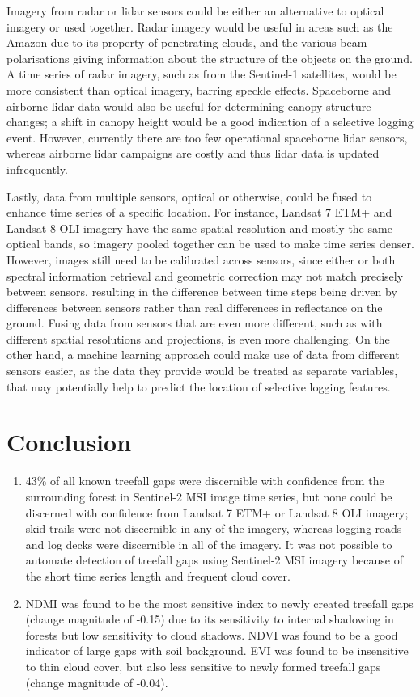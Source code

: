 \documentclass[a4paper,12pt]{scrbook}
\begin{document}
Imagery from radar or lidar sensors could be either an alternative to optical imagery or used together. Radar imagery would be useful in areas such as the Amazon due to its property of penetrating clouds, and the various beam polarisations giving information about the structure of the objects on the ground. A time series of radar imagery, such as from the Sentinel-1 satellites, would be more consistent than optical imagery, barring speckle effects. Spaceborne and airborne lidar data would also be useful for determining canopy structure changes; a shift in canopy height would be a good indication of a selective logging event. However, currently there are too few operational spaceborne lidar sensors, whereas airborne lidar campaigns are costly and thus lidar data is updated infrequently.

Lastly, data from multiple sensors, optical or otherwise, could be fused to enhance time series of a specific location. For instance, Landsat 7 \ac{ETM+} and Landsat 8 \ac{OLI} imagery have the same spatial resolution and mostly the same optical bands, so imagery pooled together can be used to make time series denser. However, images still need to be calibrated across sensors, since either or both spectral information retrieval and geometric correction may not match precisely between sensors, resulting in the difference between time steps being driven by differences between sensors rather than real differences in reflectance on the ground. Fusing data from sensors that are even more different, such as with different spatial resolutions and projections, is even more challenging. On the other hand, a machine learning approach could make use of data from different sensors easier, as the data they provide would be treated as separate variables, that may potentially help to predict the location of selective logging features.

\chapter{Conclusion}

\begin{enumerate}
 \item 43\% of all known treefall gaps were discernible with confidence from the surrounding forest in Sentinel-2 \ac{MSI} image time series, but none could be discerned with confidence from Landsat 7 \ac{ETM+} or Landsat 8 \ac{OLI} imagery; skid trails were not discernible in any of the imagery, whereas logging roads and log decks were discernible in all of the imagery. It was not possible to automate detection of treefall gaps using Sentinel-2 \ac{MSI} imagery because of the short time series length and frequent cloud cover.
 \item \ac{NDMI} was found to be the most sensitive index to newly created treefall gaps (change magnitude of -0.15) due to its sensitivity to internal shadowing in forests but low sensitivity to cloud shadows. \ac{NDVI} was found to be a good indicator of large gaps with soil background. \ac{EVI} was found to be insensitive to thin cloud cover, but also less sensitive to newly formed treefall gaps (change magnitude of -0.04).
\end{enumerate}
\end{document}
